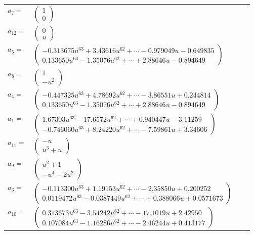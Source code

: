 \documentclass[1p]{elsarticle_modified}
\theoremstyle{definition}
\begin{document}
\begin{tabular}{m{7pt} m{180pt} m{7pt} m{180pt} }
\flushright $a_{7}=$&$\begin{pmatrix}1\\0\end{pmatrix}$ \\
\flushright $a_{12}=$&$\begin{pmatrix}0\\u\end{pmatrix}$ \\
\flushright $a_{5}=$&$\begin{pmatrix}-0.313675 u^{63}+3.43616 u^{62}+\cdots-0.979049 u-0.649835\\0.133650 u^{63}-1.35076 u^{62}+\cdots+2.88646 u-0.894649\end{pmatrix}$ \\
\flushright $a_{8}=$&$\begin{pmatrix}1\\- u^2\end{pmatrix}$ \\
\flushright $a_{4}=$&$\begin{pmatrix}-0.447325 u^{63}+4.78692 u^{62}+\cdots-3.86551 u+0.244814\\0.133650 u^{63}-1.35076 u^{62}+\cdots+2.88646 u-0.894649\end{pmatrix}$ \\
\flushright $a_{1}=$&$\begin{pmatrix}1.67303 u^{63}-17.6572 u^{62}+\cdots+0.940447 u-3.11259\\-0.746060 u^{63}+8.24220 u^{62}+\cdots-7.59861 u+3.34606\end{pmatrix}$ \\
\flushright $a_{11}=$&$\begin{pmatrix}- u\\u^3+u\end{pmatrix}$ \\
\flushright $a_{9}=$&$\begin{pmatrix}u^2+1\\- u^4-2 u^2\end{pmatrix}$ \\
\flushright $a_{3}=$&$\begin{pmatrix}-0.113300 u^{63}+1.19153 u^{62}+\cdots-2.35850 u+0.200252\\0.0119472 u^{63}-0.0387449 u^{62}+\cdots+0.388066 u+0.0571673\end{pmatrix}$ \\
\flushright $a_{10}=$&$\begin{pmatrix}0.313673 u^{63}-3.54242 u^{62}+\cdots-17.1019 u+2.42950\\0.107084 u^{63}-1.16286 u^{62}+\cdots-2.46244 u+0.413177\end{pmatrix}$ \\

\end{tabular}
\end{document}
